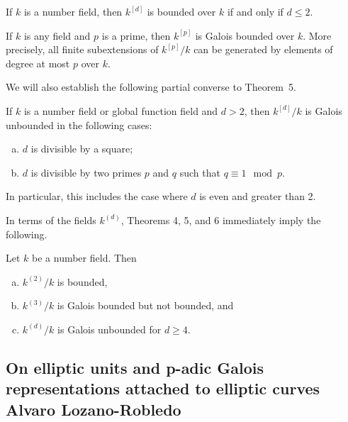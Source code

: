 \begin{thm}[4]
If $k$ is a number field, then $k^{[d]}$ is bounded over $k$ if and only if $d \leq 2$.
\end{thm}


\begin{thm}[5]
If $k$ is any field and $p$ is a prime, then $k^{[p]}$ is Galois bounded over $k$. More precisely, all finite subextensions of $k^{[p]}/k$ can be generated by elements of degree at most $p$ over $k$.
\end{thm}


We will also establish the following partial converse to Theorem~5.

\begin{thm}[6]
If $k$ is a number field or global function field and $d > 2$, then $k^{[d]}/k$ is Galois
unbounded in the following cases:
	\begin{enumerate}[(a)]
	\item $d$ is divisible by a square;
	\item $d$ is divisible by two primes $p$ and $q$ such that $q \equiv 1 \mod p$.
	\end{enumerate}
In particular, this includes the case where $d$ is even and greater than 2.
\end{thm}


In terms of the fields $k^{(d)}$, Theorems 4, 5, and 6 immediately imply the following.


\begin{cor}[7]
Let $k$ be a number field. Then
	\begin{enumerate}[(a)]
	\item $k^{(2)}/k$ is bounded,
	\item $k^{(3)}/k$ is Galois bounded but not bounded, and
	\item $k^{(d)}/k$ is Galois unbounded for $d \geq 4$.
	\end{enumerate}
\end{cor}


\subsection{On elliptic units and p-adic Galois representations attached to elliptic curves Alvaro Lozano-Robledo}

